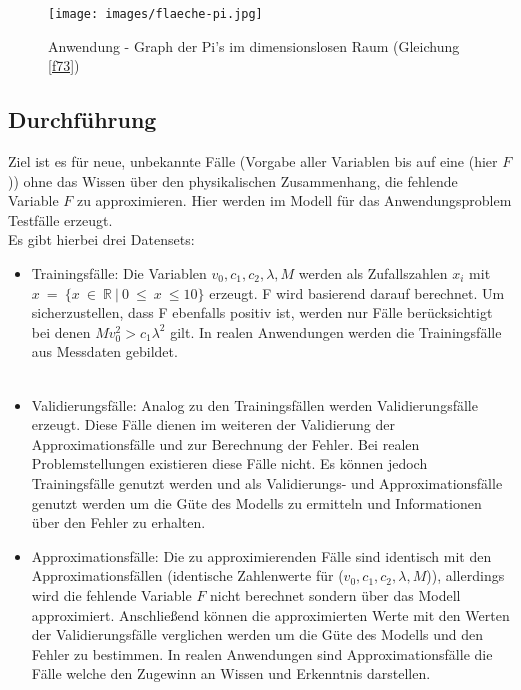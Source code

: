 \begin{figure}[h]
	\centering
		\texttt{[image: images/flaeche-pi.jpg]}
	\caption[Anwendung - Graph im dimensionslosen Raum]{Anwendung - Graph der Pi's im dimensionslosen Raum (Gleichung \eqref{f73})}
	\label{fig:piDat}
\end{figure}
\newpage
\subsection{Durchführung}
\label{subsec:durchBsp}

Ziel ist es für neue, unbekannte Fälle  (Vorgabe aller Variablen bis auf eine (hier $F$)) ohne das Wissen über den physikalischen Zusammenhang, die fehlende Variable $F$ zu approximieren. Hier werden im Modell für das Anwendungsproblem Testfälle erzeugt.\\ Es gibt hierbei drei Datensets:\begin{itemize}
\item Trainingsfälle: Die Variablen $v_0, c_1, c_2, \lambda, M$ werden als Zufallszahlen $x_i$ mit \\$x~=~\{x~\in~\mathbb{R}~|~0~\le~x~\leq 10\}$ erzeugt. F wird basierend darauf berechnet. Um sicherzustellen, dass F ebenfalls positiv ist, werden nur Fälle berücksichtigt bei denen $M v_0^2 > c_1 \lambda^2$ gilt. In realen Anwendungen werden die Trainingsfälle aus Messdaten gebildet.\\
\parskip 12pt \\
\item Validierungsfälle: Analog zu den Trainingsfällen werden Validierungsfälle erzeugt. Diese Fälle dienen im weiteren der Validierung der Approximationsfälle und zur Berechnung der Fehler. Bei realen Problemstellungen existieren diese Fälle nicht. Es können jedoch Trainingsfälle genutzt werden und als Validierungs- und Approximationsfälle genutzt werden um die Güte des Modells zu ermitteln und Informationen über den Fehler zu erhalten.
\item Approximationsfälle: Die zu approximierenden Fälle sind identisch mit den Approximationsfällen (identische Zahlenwerte für ($v_0, c_1, c_2, \lambda, M$)), allerdings  wird die fehlende Variable $F$ nicht berechnet sondern über das Modell approximiert. Anschließend können die approximierten Werte mit den Werten der Validierungsfälle verglichen werden um die Güte des Modells und den Fehler zu bestimmen. In realen Anwendungen sind Approximationsfälle die Fälle welche den Zugewinn an Wissen und Erkenntnis darstellen.
\end{itemize}



